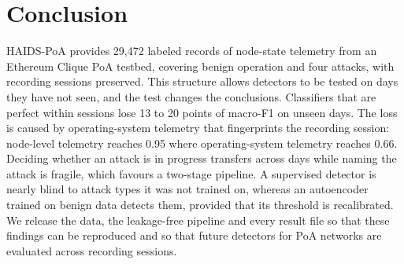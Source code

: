 \documentclass[journal]{IEEEtran}
\begin{document}
\section{Conclusion}\label{sec:conclusion}
HAIDS-PoA provides 29{,}472 labeled records of node-state telemetry from an Ethereum Clique PoA testbed, covering benign operation and four attacks, with recording sessions preserved. This structure allows detectors to be tested on days they have not seen, and the test changes the conclusions. Classifiers that are perfect within sessions lose 13 to 20 points of macro-F1 on unseen days. The loss is caused by operating-system telemetry that fingerprints the recording session: node-level telemetry reaches 0.95 where operating-system telemetry reaches 0.66. Deciding whether an attack is in progress transfers across days while naming the attack is fragile, which favours a two-stage pipeline. A supervised detector is nearly blind to attack types it was not trained on, whereas an autoencoder trained on benign data detects them, provided that its threshold is recalibrated. We release the data, the leakage-free pipeline and every result file so that these findings can be reproduced and so that future detectors for PoA networks are evaluated across recording sessions.
\end{document}
